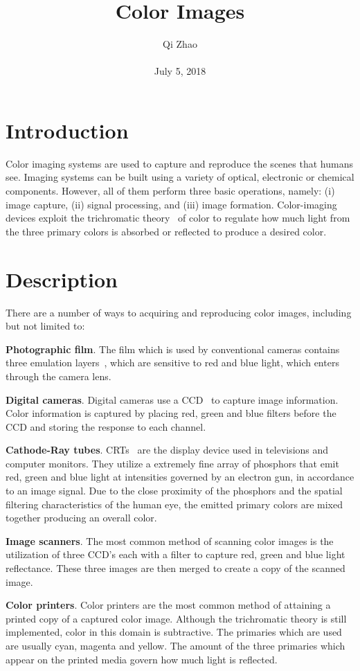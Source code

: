 \documentclass[10pt,twocolumn,letterpaper]{article}
\begin{document}
\title{ Color Images}
\author{Qi Zhao\\\\July 5, 2018}

\maketitle
\section{Introduction}
Color imaging systems are used to capture and reproduce the scenes that humans see. Imaging systems can be built using a variety of optical, electronic or chemical components. However, all of them perform three basic operations, namely: (i) image capture, (ii) signal processing, and (iii) image formation. Color-imaging devices exploit the trichromatic theory~\cite{Walters1942Some} of color to regulate how much light from the three primary colors is absorbed or reflected to produce a desired color.

\section{Description}
There are a number of ways to acquiring and reproducing color images, including but not limited to:
\par \textbf{Photographic film}. The film which is used by conventional cameras contains three emulation layers~\cite{Papanastasiou2010Bridging}, which are sensitive to red and blue light, which enters through the camera lens.
\par\textbf{Digital cameras}. Digital cameras use a CCD~\cite{Healey2002Radiometric} to capture image information. Color information is captured by placing red, green and blue filters before the CCD and storing the response to each channel.
\par\textbf{Cathode-Ray tubes}. CRTs~\cite{Molahosseini2010Efficient} are the display device used in televisions and computer monitors. They utilize a extremely fine array of phosphors that emit red, green and blue light at intensities governed by an electron gun, in accordance to an image signal. Due to the close proximity of the phosphors and the spatial filtering characteristics of the human eye, the emitted primary colors are mixed together producing an overall color.
\par\textbf{Image scanners}. The most common method of scanning color images is the utilization of three CCD's each with a filter to capture red, green and blue light reflectance. These three images are then merged to create a copy of the scanned image.
\par\textbf{Color printers}. Color printers are the most common method of attaining a printed copy of a captured color image. Although the trichromatic theory is still implemented, color in this domain is subtractive. The primaries which are used are usually cyan, magenta and yellow. The amount of the three primaries which appear on the printed media govern how much light is reflected.
\end{document}
